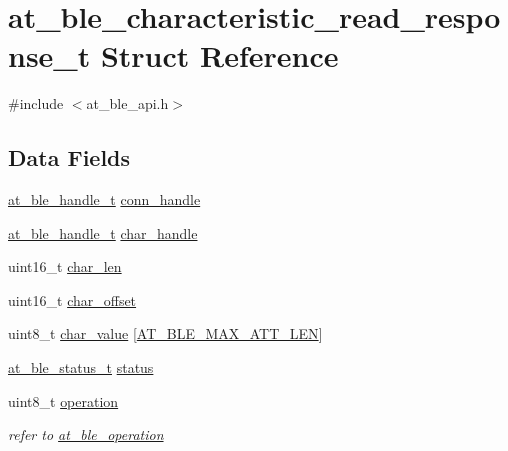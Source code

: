 \hypertarget{structat__ble__characteristic__read__response__t}{}\section{at\+\_\+ble\+\_\+characteristic\+\_\+read\+\_\+response\+\_\+t Struct Reference}
\label{structat__ble__characteristic__read__response__t}


{\ttfamily \#include $<$at\+\_\+ble\+\_\+api.\+h$>$}

\subsection*{Data Fields}
\begin{DoxyCompactItemize}
\item 
\mbox{\hyperlink{at__ble__api_8h_abd23646d0c662860741f787efc8456f2}{at\+\_\+ble\+\_\+handle\+\_\+t}} \mbox{\hyperlink{structat__ble__characteristic__read__response__t_ae42df6fd8493f8f8faeccfdd6062e96f}{conn\+\_\+handle}}
\item 
\mbox{\hyperlink{at__ble__api_8h_abd23646d0c662860741f787efc8456f2}{at\+\_\+ble\+\_\+handle\+\_\+t}} \mbox{\hyperlink{structat__ble__characteristic__read__response__t_abf2dd98b1df5d9471f3e18780eb5e5a7}{char\+\_\+handle}}
\item 
uint16\+\_\+t \mbox{\hyperlink{structat__ble__characteristic__read__response__t_a0fbd6e42ec188c22bdf8c86749e4e32e}{char\+\_\+len}}
\item 
uint16\+\_\+t \mbox{\hyperlink{structat__ble__characteristic__read__response__t_aae5ce94fd63554041656da638d7d1a19}{char\+\_\+offset}}
\item 
uint8\+\_\+t \mbox{\hyperlink{structat__ble__characteristic__read__response__t_a3087f6044198797c737a35950732fbe7}{char\+\_\+value}} \mbox{[}\mbox{\hyperlink{at__ble__api_8h_aef91d9f37b950f3551cde0f9f5b01c50}{A\+T\+\_\+\+B\+L\+E\+\_\+\+M\+A\+X\+\_\+\+A\+T\+T\+\_\+\+L\+EN}}\mbox{]}
\item 
\mbox{\hyperlink{group__error__codes__group_ga3b1db9b95feb157b3c188ca27fe76988}{at\+\_\+ble\+\_\+status\+\_\+t}} \mbox{\hyperlink{structat__ble__characteristic__read__response__t_a0b48093fc2030779fc47e5216f8019e2}{status}}
\item 
uint8\+\_\+t \mbox{\hyperlink{structat__ble__characteristic__read__response__t_a97d486d6926f9137837e1d8ecf0bbfdd}{operation}}
\begin{DoxyCompactList}\small\item\em refer to \mbox{\hyperlink{at__ble__api_8h_a9660b10ef751ef8858a2c291518031a6}{at\+\_\+ble\+\_\+operation}} \end{DoxyCompactList}\end{DoxyCompactItemize}


